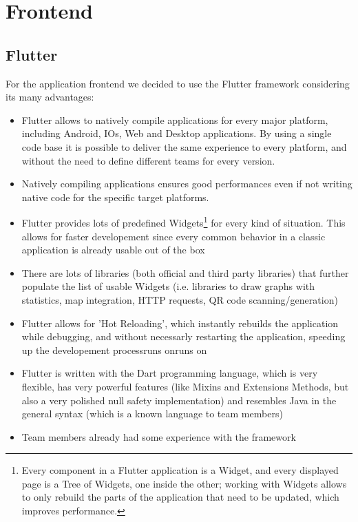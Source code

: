 \section{Frontend}
\subsection{Flutter}

For the application frontend we decided to use the Flutter framework considering its many advantages:
\begin{itemize}
    \item Flutter allows to natively compile applications for every major platform, including Android, IOs, Web and Desktop applications. By using a single code base it is possible to deliver the same experience to every platform, and without the need to define different teams for every version.
    \item Natively compiling applications ensures good performances even if not writing native code for the specific target platforms.
    \item Flutter provides lots of predefined Widgets\footnote{Every component in a Flutter application is a Widget, and every displayed page is a Tree of Widgets, one inside the other; working with Widgets allows to only rebuild the parts of the application that need to be updated, which improves performance.} for every kind of situation. This allows for faster developement since every common behavior in a classic application is already usable out of the box
    \item There are lots of libraries (both official and third party libraries) that further populate the list of usable Widgets (i.e. libraries to draw graphs with statistics, map integration, HTTP requests, QR code scanning/generation)
    \item Flutter allows for 'Hot Reloading', which instantly rebuilds the application while debugging, and without necessarly restarting the application, speeding up the developement processruns onruns on
    \item Flutter is written with the Dart programming language, which is very flexible, has very powerful features (like Mixins and Extensions Methods, but also a very polished null safety implementation) and resembles Java in the general syntax (which is a known language to team members)
    \item Team members already had some experience with the framework
\end{itemize}

